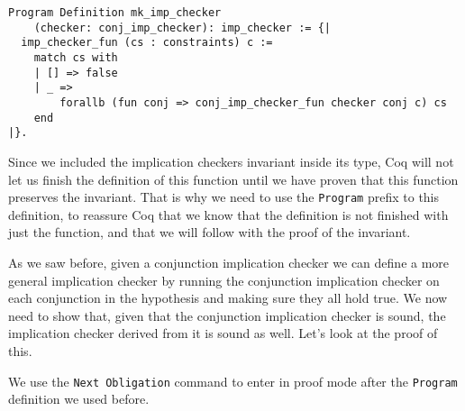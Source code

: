 \begin{verbatim}
Program Definition mk_imp_checker 
    (checker: conj_imp_checker): imp_checker := {|
  imp_checker_fun (cs : constraints) c := 
    match cs with
    | [] => false
    | _ => 
        forallb (fun conj => conj_imp_checker_fun checker conj c) cs
    end
|}.
\end{verbatim}

Since we included the implication checkers invariant inside its type, Coq will not let us finish the definition
of this function until we have proven that this function preserves the invariant. That is why we need to use
the \texttt{Program} prefix to this definition, to reassure Coq that we know that the definition is not finished 
with just the function, and that we will follow with the proof of the invariant.

As we saw before, given a conjunction implication checker we can define a more general implication checker
by running the conjunction implication checker on each conjunction in the hypothesis and making sure they 
all hold true. We now need to show that, given that the conjunction implication checker is sound, the
implication checker derived from it is sound as well. Let's look at the proof of this.

We use the \texttt{Next Obligation} command to enter in proof mode after the \texttt{Program} definition we used before.

